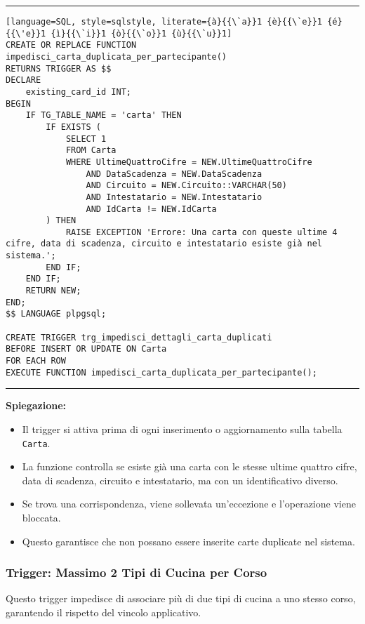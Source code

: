 \noindent\rule{\textwidth}{0.4pt}
\begin{lstlisting}[language=SQL, style=sqlstyle, literate={à}{{\`a}}1 {è}{{\`e}}1 {é}{{\'e}}1 {ì}{{\`i}}1 {ò}{{\`o}}1 {ù}{{\`u}}1]
CREATE OR REPLACE FUNCTION impedisci_carta_duplicata_per_partecipante()
RETURNS TRIGGER AS $$
DECLARE
    existing_card_id INT;
BEGIN
    IF TG_TABLE_NAME = 'carta' THEN
        IF EXISTS (
            SELECT 1
            FROM Carta
            WHERE UltimeQuattroCifre = NEW.UltimeQuattroCifre
                AND DataScadenza = NEW.DataScadenza
                AND Circuito = NEW.Circuito::VARCHAR(50)
                AND Intestatario = NEW.Intestatario
                AND IdCarta != NEW.IdCarta
        ) THEN
            RAISE EXCEPTION 'Errore: Una carta con queste ultime 4 cifre, data di scadenza, circuito e intestatario esiste già nel sistema.';
        END IF;
    END IF;
    RETURN NEW;
END;
$$ LANGUAGE plpgsql;

CREATE TRIGGER trg_impedisci_dettagli_carta_duplicati
BEFORE INSERT OR UPDATE ON Carta
FOR EACH ROW
EXECUTE FUNCTION impedisci_carta_duplicata_per_partecipante();
\end{lstlisting}
\noindent\rule{\textwidth}{0.4pt}

\textbf{Spiegazione:}
\begin{itemize}
    \item Il trigger si attiva prima di ogni inserimento o aggiornamento sulla tabella \texttt{Carta}.
    \item La funzione controlla se esiste già una carta con le stesse ultime quattro cifre, data di scadenza, circuito e intestatario, ma con un identificativo diverso.
    \item Se trova una corrispondenza, viene sollevata un'eccezione e l'operazione viene bloccata.
    \item Questo garantisce che non possano essere inserite carte duplicate nel sistema.
\end{itemize}

\subsubsection{Trigger: Massimo 2 Tipi di Cucina per Corso}

Questo trigger impedisce di associare più di due tipi di cucina a uno stesso corso, garantendo il rispetto del vincolo applicativo.


